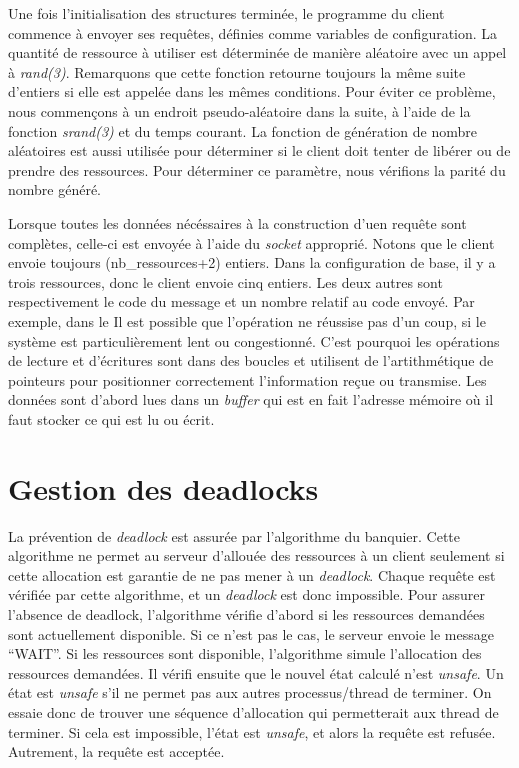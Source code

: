 \documentclass[letterpaper,12pt]{scrartcl}
\begin{document}
Une fois l'initialisation des structures terminée, le programme du client commence à envoyer ses requêtes, définies comme variables de configuration. La quantité de ressource à utiliser est déterminée de manière aléatoire avec un appel à \textit{rand(3)}. Remarquons que cette fonction retourne toujours la même suite d'entiers si elle est appelée dans les mêmes conditions. Pour éviter ce problème, nous commençons à un endroit pseudo-aléatoire dans la suite, à l'aide de la fonction \textit{srand(3)} et du temps courant. La fonction de génération de nombre aléatoires est aussi utilisée pour déterminer si le client doit tenter de libérer ou de prendre des ressources. Pour déterminer ce paramètre, nous vérifions la parité du nombre généré. 

Lorsque toutes les données nécéssaires à la construction d'uen requête sont complètes, celle-ci est envoyée à l'aide du \textit{socket} approprié. Notons que le client envoie toujours (nb_ressources+2) entiers. Dans la configuration de base, il y a trois ressources, donc le client envoie cinq entiers. Les deux autres sont respectivement le code du message et un nombre relatif au code envoyé. Par exemple, dans le  Il est possible que l'opération ne réussise pas d'un coup, si le système est particulièrement lent ou congestionné. C'est pourquoi les opérations de lecture et d'écritures sont dans des boucles et utilisent de l'artithmétique de pointeurs pour positionner correctement l'information reçue ou transmise. Les données sont d'abord lues dans un \textit{buffer} qui est en fait l'adresse mémoire où il faut stocker ce qui est lu ou écrit.
\section{Gestion des deadlocks}
La prévention de \emph{deadlock} est assurée par l'algorithme du banquier.
Cette algorithme ne permet au serveur d'allouée des ressources à un client seulement si cette allocation est garantie de ne pas mener à un \emph{deadlock}.
Chaque requête est vérifiée par cette algorithme, et un \emph{deadlock} est donc impossible.
Pour assurer l'absence de deadlock, l'algorithme vérifie d'abord si les ressources demandées sont actuellement disponible.
Si ce n'est pas le cas, le serveur envoie le message ``WAIT''.
Si les ressources sont disponible, l'algorithme simule l'allocation des ressources demandées.
Il vérifi ensuite que le nouvel état calculé n'est \emph{unsafe}.
Un état est \emph{unsafe} s'il ne permet pas aux autres processus/thread de terminer.
On essaie donc de trouver une séquence d'allocation qui permetterait aux thread de terminer.
Si cela est impossible, l'état est \emph{unsafe}, et alors la requête est refusée.
Autrement, la requête est acceptée.
\end{document}
